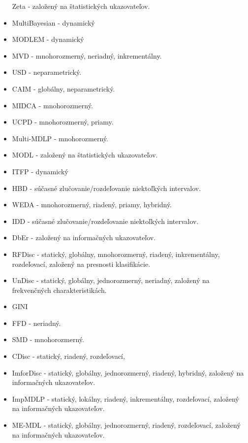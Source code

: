 \begin{itemize}
Zeta - založený na štatistických ukazovateľov. 
\cite{Ho1997} 
\item
MultiBayesian - dynamický 
\cite{Monti1998} 
\item
MODLEM - dynamický
\cite{Grzymala2001} 
\item
MVD - mnohorozmerný, neriadný, inkrementálny. 
\cite{Bay2001} 
\item
USD - neparametrický. 
\cite{Giraldez2002} 
\item
CAIM - globálny, neparametrický. 
\cite{Kurgan2004} 
\item
MIDCA - mnohorozmerný. 
\cite{Chao2005} 
\item
UCPD - mnohorozmerný, priamy. 
\cite{Mehta2005} 
\item
Multi-MDLP - mnohorozmerný.
\cite{Ferrandiz2005} 
\item
MODL - založený na štatistických ukazovateľov. 
\cite{Boulle2006} 
\item
ITFP - dynamický
\cite{Au2006} 
\item
HBD - súčasné zlučovanie/rozdeľovanie niektoľkých intervalov. 
\cite{Lee2007} 
\item
WEDA - mnohorozmerný, riadený, priamy, hybridný. 
\cite{Flores2007} 
\item
IDD - súčasné zlučovanie/rozdeľovanie niektoľkých intervalov. 
\cite{Ruiz2008} 
\item
DbEr - založený na informačných ukazovateľov. 
\cite{Hu2008} 
\item
RFDisc - statický, globálny, mnohorozmerný, riadený, inkrementálny, rozdeľovací, založený na presnosti klasifikácie.
\cite{Berrado2009} 
\item
UnDisc - statický, globálny, jednorozmerný, neriadný, založený na frekvenčných charakteristikách.
\cite{Jiang2009} 
\item
GINI 
\cite{Jin2009} 
\item
FFD - neriadný. 
\cite{Yang2009a} 
\item
SMD - mnohorozmerný. 
\cite{Jiang2009} 
\item
CDisc - statický, riadený, rozdeľovací, 
\cite{Nemmiche2010} 
\item
ImforDisc - statický, globálny, jednorozmerný,  riadený, hybridný, založený na informačných ukazovateľov.
\cite{Zhu2010} 
\item
ImpMDLP - statický, lokálny, riadený, inkrementálny, rozdeľovací, založený na informačných ukazovateľov. 
\cite{Li2010a} 
\item
ME-MDL - statický, globálny, jednorozmerný, riadený, rozdeľovací, založený na informačných ukazovateľov.
\cite{Gupta2010} 


\end{itemize}

